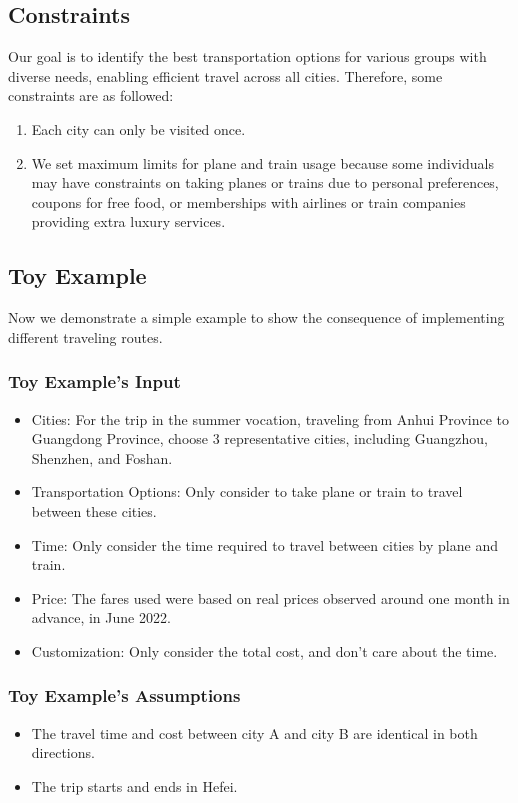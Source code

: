 \documentclass{article}
\begin{document}
\subsection{Constraints}

Our goal is to identify the best transportation options for various groups with
diverse needs, enabling efficient travel across all cities. Therefore, some
constraints are as followed:

\begin{enumerate}[leftmargin=2cm]
  \item Each city can only be visited once.
  \item We set maximum limits for plane and train usage because some individuals may
        have constraints on taking planes or trains due to personal preferences,
        coupons for free food, or memberships with airlines or train companies
        providing extra luxury services.
\end{enumerate}

\subsection{Toy Example}

Now we demonstrate a simple example to show the consequence of implementing
different traveling routes.

\subsubsection{Toy Example's Input}
\begin{itemize}
  \item Cities: For the trip in the summer vocation, traveling from Anhui Province to
        Guangdong Province, choose 3 representative cities, including Guangzhou,
        Shenzhen, and Foshan.
  \item Transportation Options: Only consider to take plane or train to travel between
        these cities.
  \item Time: Only consider the time required to travel between cities by plane and
        train.
  \item Price: The fares used were based on real prices observed around one month in
        advance, in June 2022.
  \item Customization: Only consider the total cost, and don't care about the time.
\end{itemize}

\subsubsection{Toy Example's Assumptions}
\begin{itemize}
  \item The travel time and cost between city A and city B are identical in both
        directions.
  \item The trip starts and ends in Hefei.
\end{itemize}
\end{document}

